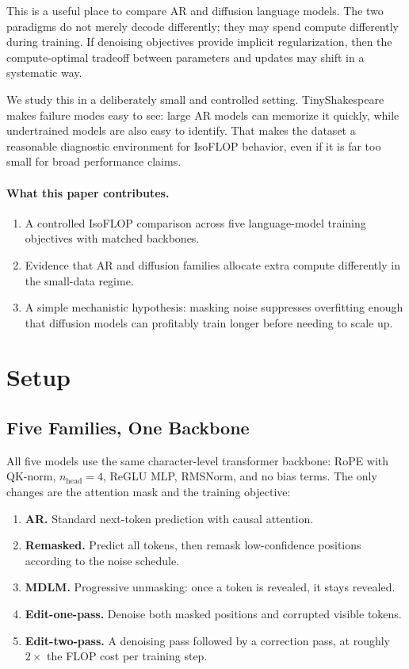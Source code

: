 \documentclass[11pt,a4paper]{article}
\begin{document}
This is a useful place to compare AR and diffusion language models.
The two paradigms do not merely decode differently; they may spend compute differently during training.
If denoising objectives provide implicit regularization, then the compute-optimal tradeoff between parameters and updates may shift in a systematic way.

We study this in a deliberately small and controlled setting.
TinyShakespeare makes failure modes easy to see: large AR models can memorize it quickly, while undertrained models are also easy to identify.
That makes the dataset a reasonable diagnostic environment for IsoFLOP behavior, even if it is far too small for broad performance claims.

\paragraph{What this paper contributes.}
\begin{enumerate}
    \item A controlled IsoFLOP comparison across five language-model training objectives with matched backbones.
    \item Evidence that AR and diffusion families allocate extra compute differently in the small-data regime.
    \item A simple mechanistic hypothesis: masking noise suppresses overfitting enough that diffusion models can profitably train longer before needing to scale up.
\end{enumerate}

\section{Setup}
\label{sec:setup}

\subsection{Five Families, One Backbone}

All five models use the same character-level transformer backbone: RoPE with QK-norm, $n_\text{head}=4$, ReGLU MLP, RMSNorm, and no bias terms.
The only changes are the attention mask and the training objective:

\begin{enumerate}
    \item \textbf{AR.} Standard next-token prediction with causal attention.
    \item \textbf{Remasked.} Predict all tokens, then remask low-confidence positions according to the noise schedule.
    \item \textbf{MDLM.} Progressive unmasking: once a token is revealed, it stays revealed.
    \item \textbf{Edit-one-pass.} Denoise both masked positions and corrupted visible tokens.
    \item \textbf{Edit-two-pass.} A denoising pass followed by a correction pass, at roughly $2\times$ the FLOP cost per training step.
\end{enumerate}
\end{document}
